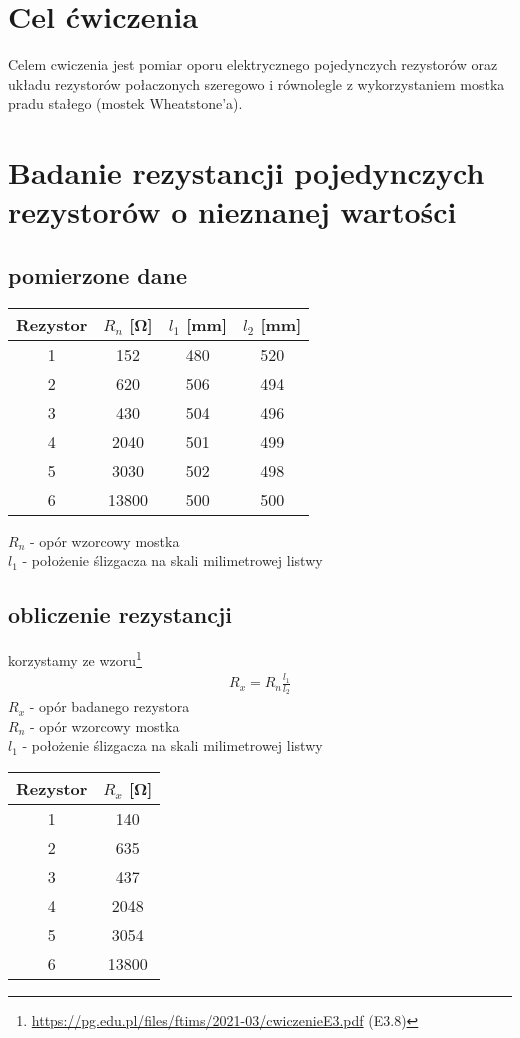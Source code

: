 \documentclass{article}
\begin{document}
\section{Cel ćwiczenia}
Celem cwiczenia jest pomiar oporu elektrycznego pojedynczych rezystorów
oraz układu rezystorów połaczonych szeregowo i równolegle z wykorzystaniem
mostka pradu stałego (mostek Wheatstone’a).

\section{Badanie rezystancji pojedynczych rezystorów o nieznanej wartości}
\subsection{pomierzone dane}
\begin{center}
\begin{tabular}{ c | c | c | c}
Rezystor & $R_n$ [\si{\ohm}] & $l_1$ [mm] & $l_2$ [mm]\\
\hline
 1    & 152 & 480 & 520\\ 
 2    & 620 & 506 & 494\\ 
 3  & 430 & 504 & 496\\ 
 4  & 2040 & 501 & 499\\
 5   & 3030 & 502 & 498\\
 6  & 13800 & 500 & 500\\
 
\end{tabular}
\end{center}
$R_n$ - opór wzorcowy mostka\\ 
$l_1$ - położenie ślizgacza na skali milimetrowej listwy\\

\subsection{obliczenie rezystancji}
korzystamy ze wzoru\footnote{\url{https://pg.edu.pl/files/ftims/2021-03/cwiczenieE3.pdf} (E3.8)}
\begin{gather*}
	R_x = R_n\frac{l_1}{l_2}
\end{gather*} 
$R_x$ - opór badanego rezystora\\ 
$R_n$ - opór wzorcowy mostka\\ 
$l_1$ - położenie ślizgacza na skali milimetrowej listwy\\

\begin{center}
\begin{tabular}{ c | c }
Rezystor & $R_x$ [\si{\ohm}]\\
\hline
 1    & 140 \\ 
 2    & 635\\ 
 3  & 437 \\ 
 4  & 2048 \\
 5   & 3054\\
 6  & 13800 \\
 
\end{tabular}
\end{center}
\end{document}
